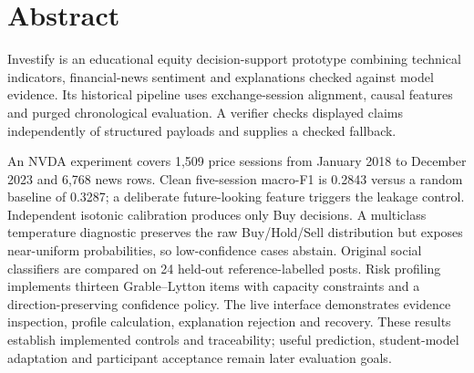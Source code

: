 \chapter*{Abstract}
Investify is an educational equity decision-support prototype combining technical indicators, financial-news sentiment and explanations checked against model evidence. Its historical pipeline uses exchange-session alignment, causal features and purged chronological evaluation. A verifier checks displayed claims independently of structured payloads and supplies a checked fallback.

An NVDA experiment covers 1,509 price sessions from January 2018 to December 2023 and 6,768 news rows. Clean five-session macro-F1 is 0.2843 versus a random baseline of 0.3287; a deliberate future-looking feature triggers the leakage control. Independent isotonic calibration produces only Buy decisions. A multiclass temperature diagnostic preserves the raw Buy/Hold/Sell distribution but exposes near-uniform probabilities, so low-confidence cases abstain. Original social classifiers are compared on 24 held-out reference-labelled posts. Risk profiling implements thirteen Grable--Lytton items with capacity constraints and a direction-preserving confidence policy. The live interface demonstrates evidence inspection, profile calculation, explanation rejection and recovery. These results establish implemented controls and traceability; useful prediction, student-model adaptation and participant acceptance remain later evaluation goals.
